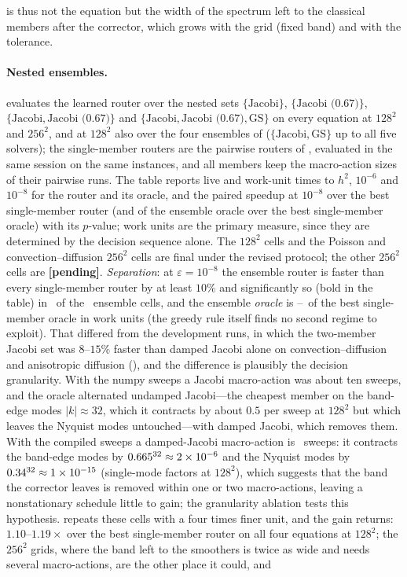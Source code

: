 is thus not the equation but the width of the spectrum left to the classical members after the corrector, which grows with the grid (fixed band) and with the tolerance.

\paragraph{Nested ensembles.}  evaluates the learned router over the nested sets $\{\text{Jacobi}\}$, $\{\text{Jacobi (0.67)}\}$, $\{\text{Jacobi}, \text{Jacobi (0.67)}\}$ and $\{\text{Jacobi}, \text{Jacobi (0.67)}, \text{GS}\}$ on every equation at $128^2$ and $256^2$, and at $128^2$ also over the four ensembles of  ($\{\text{Jacobi}, \text{GS}\}$ up to all five solvers); the single-member routers are the pairwise routers of , evaluated in the same session on the same instances, and all members keep the macro-action sizes of their pairwise runs. The table reports live and work-unit times to $h^2$, $10^{-6}$ and $10^{-8}$ for the router and its oracle, and the paired speedup at $10^{-8}$ over the best single-member router (and of the ensemble oracle over the best single-member oracle) with its $p$-value; work units are the primary measure, since they are determined by the decision sequence alone. The $128^2$ cells and the Poisson and convection--diffusion $256^2$ cells are final under the revised protocol; the other $256^2$ cells are \textbf{[pending]}. \emph{Separation}: at $\varepsilon = 10^{-8}$ the ensemble router is faster than every single-member router by at least $10\%$ and significantly so (bold in the table) in \caNestWins\ of the \caNestNum\ ensemble cells, and the ensemble \emph{oracle} is \caNestOrMinRatio--\caNestOrMaxRatio\ of the best single-member oracle in work units (the greedy rule itself finds no second regime to exploit). That differed from the development runs, in which the two-member Jacobi set was $8$--$15\%$ faster than damped Jacobi alone on convection--diffusion and anisotropic diffusion (), and the difference is plausibly the decision granularity. With the numpy sweeps a Jacobi macro-action was about ten sweeps, and the oracle alternated undamped Jacobi---the cheapest member on the band-edge modes $|k| \approx 32$, which it contracts by about $0.5$ per sweep at $128^2$ but which leaves the Nyquist modes untouched---with damped Jacobi, which removes them. With the compiled sweeps a damped-Jacobi macro-action is \caMJacobiDamped\ sweeps: it contracts the band-edge modes by $0.665^{32} \approx 2\times 10^{-6}$ and the Nyquist modes by $0.34^{32} \approx 1\times 10^{-15}$ (single-mode factors at $128^2$), which suggests that the band the corrector leaves is removed within one or two macro-actions, leaving a nonstationary schedule little to gain; the granularity ablation tests this hypothesis.  repeats these cells with a four times finer unit, and the gain returns: $1.10$--$1.19\times$ over the best single-member router on all four equations at $128^2$; the $256^2$ grids, where the band left to the smoothers is twice as wide and needs several macro-actions, are the other place it could, and 